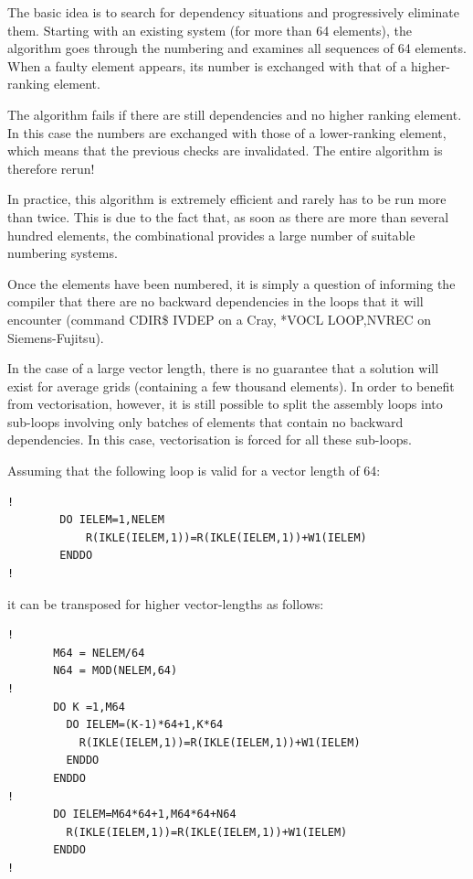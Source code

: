 
The basic idea is to search for dependency situations and progressively
eliminate them. Starting with an existing system (for more than 64 elements),
the algorithm goes through the numbering and examines all sequences of 64
elements. When a faulty element appears, its number is exchanged with that of a
higher-ranking element.

The algorithm fails if there are still dependencies and no higher ranking
element. In this case the numbers are exchanged with those of a lower-ranking
element, which means that the previous checks are invalidated. The entire
algorithm is therefore rerun!

In practice, this algorithm is extremely efficient and rarely has to be run
more than twice. This is due to the fact that, as soon as there are more than
several hundred elements, the combinational provides a large number of suitable
numbering systems.

Once the elements have been numbered, it is simply a question of informing the
compiler that there are no backward dependencies in the loops that it will
encounter (command CDIR\$ IVDEP on a Cray, *VOCL LOOP,NVREC on
Siemens-Fujitsu).

In the case of a large vector length, there is no guarantee that a solution
will exist for average grids (containing a few thousand elements). In order to
benefit from vectorisation, however, it is still possible to split the assembly
loops into sub-loops involving only batches of elements that contain no
backward dependencies. In this case, vectorisation is forced for all these
sub-loops.

Assuming that the following loop is valid for a vector length of 64:

\begin{lstlisting}[language=TelFortran]
!
        DO IELEM=1,NELEM
            R(IKLE(IELEM,1))=R(IKLE(IELEM,1))+W1(IELEM)
        ENDDO
!
\end{lstlisting}

it can be transposed for higher vector-lengths as follows:
\begin{lstlisting}[language=TelFortran]
!
       M64 = NELEM/64
       N64 = MOD(NELEM,64)
!
       DO K =1,M64
         DO IELEM=(K-1)*64+1,K*64
           R(IKLE(IELEM,1))=R(IKLE(IELEM,1))+W1(IELEM)
         ENDDO
       ENDDO
!
       DO IELEM=M64*64+1,M64*64+N64
         R(IKLE(IELEM,1))=R(IKLE(IELEM,1))+W1(IELEM)
       ENDDO
!
\end{lstlisting}

